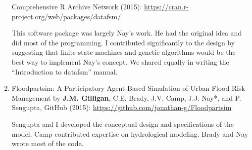 \begin{enumerate}
Comprehensive R Archive Network (2015): \url{https://cran.r-project.org/web/packages/datafsm/}
\begin{credit}
    This software package was largely Nay's work. He had the original idea and did most of the programming. I contributed significantly to the design by suggesting that finite state machines and genetic algorithms would be the best way to implement Nay's concept. We shared equally in writing the ``Introduction to datafsm'' manual.
\end{credit}
%
\item
Floodpartsim: A Participatory Agent-Based Simulation of Urban Flood Risk Management
by \textbf{J.M. Gilligan}, C.E. Brady, J.V. Camp, J.J. Nay*, and P. Sengupta,
GitHub (2015): \url{https://github.com/jonathan-g/Floodpartsim}
\begin{credit}
    Sengupta and I developed the conceptual design and specifications of the model. Camp contributed expertise on hydrological modeling.
    Brady and Nay wrote most of the code.
\end{credit}
%
\end{enumerate}


